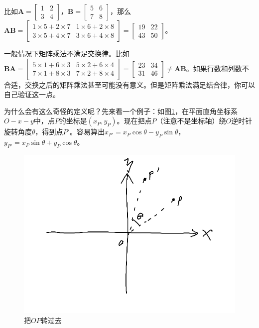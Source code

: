 比如$\mathbf{A}=\begin{bmatrix}
1 & 2 \\
3 & 4
\end{bmatrix}$，$\mathbf{B}=\begin{bmatrix}
5 & 6 \\
7 & 8
\end{bmatrix}$，那么$\mathbf{A} \mathbf{B}=\begin{bmatrix}
1 \times 5+2 \times 7 & 1 \times 6+2 \times 8 \\
3 \times 5+4 \times 7 & 3 \times 6+4 \times 8
\end{bmatrix}=\begin{bmatrix}
19 & 22 \\
43 & 50
\end{bmatrix}$。

一般情况下矩阵乘法不满足交换律。比如$\mathbf{B} \mathbf{A}=\begin{bmatrix}
5 \times 1+6 \times 3 & 5 \times 2+6 \times 4 \\
7 \times 1+8 \times 3 & 7 \times 2+8 \times 4
\end{bmatrix}=\begin{bmatrix}
23 & 34 \\
31 & 46
\end{bmatrix} \neq \mathbf{A} \mathbf{B}$。如果行数和列数不合适，交换之后的矩阵乘法甚至可能没有意义。但是矩阵乘法满足结合律，你可以自己验证这一点。

为什么会有这么奇怪的定义呢？先来看一个例子：如图\ref{fig-rotate}，在平面直角坐标系$O-x-y$中，点$P$的坐标是$(x_P, y_P)$。现在把点$P$（注意不是坐标轴）绕$O$逆时针旋转角度$\theta$，得到点$P'$。容易算出$x_{P'}=x_P \cos \theta-y_P \sin \theta$，$y_{P'}=x_P \sin \theta+y_P \cos \theta$。
\begin{figure}[htb]
\centering
\includegraphics[scale=0.5]{fig/rotate}
\caption{把$OP$转过去}
\label{fig-rotate}
\end{figure}

